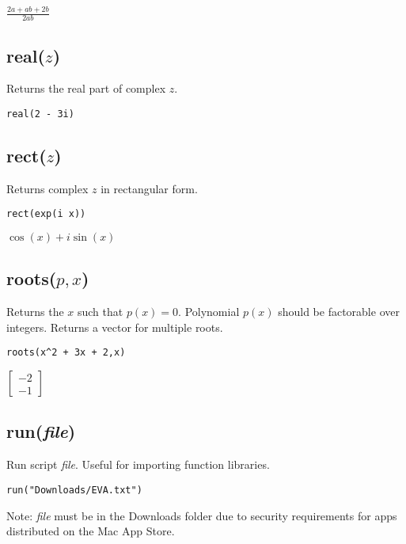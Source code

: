 \noindent
$\displaystyle \frac{2a+ab+2b}{2ab}$

\subsection*{real($z$)}

Returns the real part of complex $z$.

{\color{blue}
\begin{verbatim}
real(2 - 3i)
\end{verbatim}
}


\subsection*{rect($z$)}

Returns complex $z$ in rectangular form.

{\color{blue}
\begin{verbatim}
rect(exp(i x))
\end{verbatim}
}

\noindent
$\displaystyle \cos(x)+i\sin(x)$

\subsection*{roots($p,x$)}

Returns the $x$ such that $p(x)=0$.
Polynomial $p(x)$ should be factorable over integers.
Returns a vector for multiple roots.

{\color{blue}
\begin{verbatim}
roots(x^2 + 3x + 2,x)
\end{verbatim}
}

\noindent
$\displaystyle
\begin{bmatrix}
-2\\
-1
\end{bmatrix}
$

\subsection*{run({\it file})}

Run script {\it file}.
Useful for importing function libraries.

{\color{blue}
\begin{verbatim}
run("Downloads/EVA.txt")
\end{verbatim}
}

\noindent
Note: {\it file} must be in the Downloads folder due to security requirements for apps distributed on the Mac App Store.

